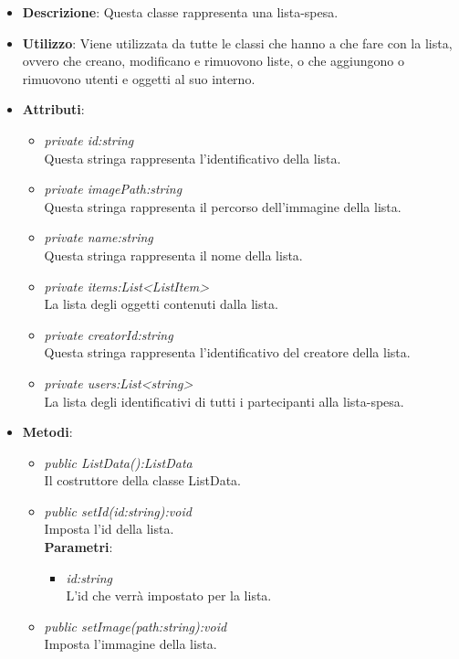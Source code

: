 \begin{itemize}
\item \textbf{Descrizione}: Questa classe rappresenta una lista-spesa.
\item \textbf{Utilizzo}: Viene utilizzata da tutte le classi che hanno a che fare con la lista, ovvero che creano, modificano e rimuovono liste, o che aggiungono o rimuovono utenti e oggetti al suo interno.
\item \textbf{Attributi}: 
	\begin{itemize}
	\item \textit{private id:string}\\
	Questa stringa rappresenta l'identificativo della lista.
	\item \textit{private imagePath:string}\\
	Questa stringa rappresenta il percorso dell'immagine della lista.
	\item \textit{private name:string}\\
	Questa stringa rappresenta il nome della lista.
	\item \textit{private items:List<ListItem>}\\
	La lista degli oggetti contenuti dalla lista.
	\item \textit{private creatorId:string}\\
	Questa stringa rappresenta l'identificativo del creatore della lista.
	\item \textit{private users:List<string>}\\
	La lista degli identificativi di tutti i partecipanti alla lista-spesa.
	\end{itemize}
\item \textbf{Metodi}:
	\begin{itemize}
	\item \textit{public ListData():ListData}\\
	Il costruttore della classe ListData.
	\item \textit{public setId(id:string):void}\\
	Imposta l'id della lista.
				\\ \textbf{Parametri}: \begin{itemize}
				\item \textit{id:string}\\
				L'id che verrà impostato per la lista.
			\end{itemize} 
	\item \textit{public setImage(path:string):void}\\
	Imposta l'immagine della lista.

\end{itemize}
\end{itemize}
